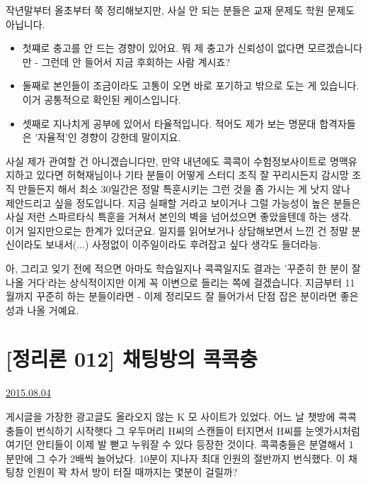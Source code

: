 작년말부터 올초부터 쭉 정리해보지만, 사실 안 되는 분들은 교재 문제도 학원 문제도 아닙니다.
\begin{itemize}
    \item  첫쨰로 충고를 안 드는 경향이 있어요. 뭐 제 충고가 신뢰성이 없다면 모르겠습니다만 - 그런데 안 들어서 지금 후회하는 사람 계시죠?
    \item 둘째로 본인들이 조금이라도 고통이 오면 바로 포기하고 밖으로 도는 게 있습니다. 이거 공통적으로 확인된 케이스입니다.
    \item 셋째로 지나치게 공부에 있어서 타율적입니다. 적어도 제가 보는 명문대 합격자들은 '자율적'인 경향이 강한데 말이지요.
\end{itemize}
\vspace{5mm}

사실 제가 관여할 건 아니겠습니다만, 만약 내년에도 콕콕이 수험정보사이트로 명맥유지하고 있다면
허혁재님이나 기타 분들이 어떻게 스터디 조직 잘 꾸리시든지 감시망 조직 만들든지 해서
최소 30일간은 정말 특훈시키는 그런 것을 좀 가시는 게 낫지 않나 제안드리고 싶을 정도입니다.
지금 실패할 거라고 보이거나 그럴 가능성이 높은 분들은 사실 저런 스파르타식 특훈을 거쳐서 본인의 벽을 넘어섰으면 좋았을텐데 하는 생각.
이거 일지만으로는 한계가 있더군요.
일지를 읽어보거나 상담해보면서 느낀 건 정말 분신이라도 보내서(...) 사정없이 이주일이라도 후려잡고 싶다 생각도 들더라능.
\vspace{5mm}

아, 그리고 잊기 전에 적으면
아마도 학습일지나 콕콕일지도 결과는 '꾸준히 한 분이 잘 나올 거다'라는 상식적이지만 이게 꼭 이변으로 들리는 쪽에 걸겠습니다.
지금부터 11월까지 꾸준히 하는 분들이라면 - 이제 정리모드 잘 들어가서 단점 잡은 분이라면 좋은 성과 나올 거예요.
\vspace{5mm}






\section{[정리론 012] 채팅방의 콕콕충}
\href{https://www.kockoc.com/Apoc/229516}{2015.08.04}

\vspace{5mm}

게시글을 가장한 광고글도 올라오지 않는 K 모 사이트가 있었다.
어느 날 챗방에 콕콕충들이 번식하기 시작햇다
그 우두머리 H씨의 스캔들이 터지면서 H씨를 눈엣가시처럼 여기던 안티들이 이제 발 뻗고 누워잘 수 있다 등장한 것이다.
콕콕충들은 분열해서 1분만에 그 수가 2배씩 늘어났다.
10분이 지나자 최대 인원의 절반까지 번식했다.
이 채팅창 인원이 꽉 차서 방이 터질 때까지는 몇분이 걸릴까?
\vspace{5mm}

